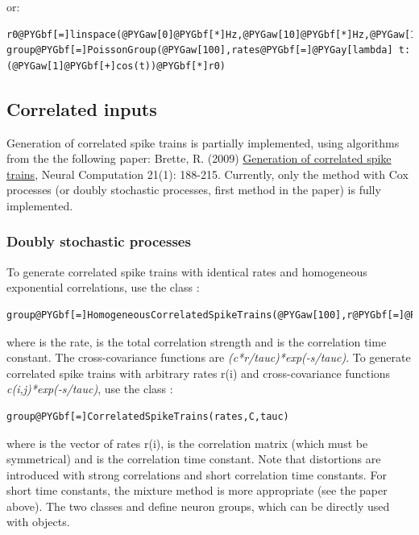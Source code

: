 \documentclass[letterpaper,10pt,english]{manual}
\begin{document}
or:

\begin{Verbatim}[commandchars=@\[\]]
r0@PYGbf[=]linspace(@PYGaw[0]@PYGbf[*]Hz,@PYGaw[10]@PYGbf[*]Hz,@PYGaw[100])
group@PYGbf[=]PoissonGroup(@PYGaw[100],rates@PYGbf[=]@PYGay[lambda] t:(@PYGaw[1]@PYGbf[+]cos(t))@PYGbf[*]r0)
\end{Verbatim}


\subsection{Correlated inputs}

Generation of correlated spike trains is partially implemented, using algorithms from the
the following paper: Brette, R. (2009) \href{http://www.di.ens.fr/\textasciitilde{}brette/papers/Brette2008NC.html}{Generation of correlated spike trains},
Neural Computation 21(1): 188-215. Currently, only the method with Cox processes
(or doubly stochastic processes, first method in the paper) is fully implemented.


\subsubsection{Doubly stochastic processes}

To generate correlated spike trains with identical rates and homogeneous exponential correlations,
use the class :

\begin{Verbatim}[commandchars=@\[\]]
group@PYGbf[=]HomogeneousCorrelatedSpikeTrains(@PYGaw[100],r@PYGbf[=]@PYGaw[10]@PYGbf[*]Hz,c@PYGbf[=]@PYGaw[0.1],tauc@PYGbf[=]@PYGaw[10]@PYGbf[*]ms)
\end{Verbatim}

where  is the rate,  is the total correlation strength and  is the correlation time constant.
The cross-covariance functions are \emph{(c*r/tauc)*exp(-\textbar{}s\textbar{}/tauc)}.
To generate correlated spike trains with arbitrary rates r(i) and
cross-covariance functions \emph{c(i,j)*exp(-\textbar{}s\textbar{}/tauc)}, use the class :

\begin{Verbatim}[commandchars=@\[\]]
group@PYGbf[=]CorrelatedSpikeTrains(rates,C,tauc)
\end{Verbatim}

where  is the vector of rates r(i),  is the correlation matrix (which must be
symmetrical) and  is the correlation time constant. Note that distortions are introduced
with strong correlations and short correlation time constants. For short time constants,
the mixture method is more appropriate (see the paper above).
The two classes  and 
define neuron groups, which can be directly used with \hyperlink{brian.Connection}{} objects.
\end{document}
